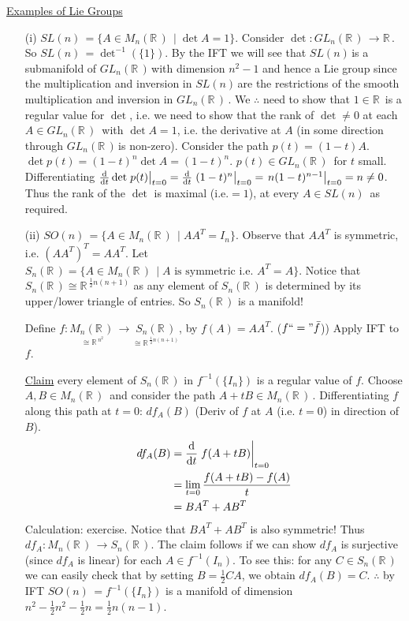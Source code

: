 \documentclass[12pt,a4paper]{article}
\newcommand{\rR}{\ensuremath{\mathbb{R}\,}}
\newcommand{\mnr}{\ensuremath{M_n(\rR)\,}}
\newcommand{\glnr}{\ensuremath{GL_n(\rR)\,}}
\newcommand{\gson}{\ensuremath{SO(n)\,}}
\newcommand{\gsln}{\ensuremath{SL(n)\,}}
\newcommand{\ul}[1]{\underline{#1}}
\begin{document}
\ul{Examples of Lie Groups}
\begin{itemize}
\item[(i)] $\gsln = \{A\in \mnr \mid \det A=1\}$. Consider $\det:\glnr\to \rR$. So $\gsln = \det^{-1}(\{1\})$.  By the IFT we will see that \gsln is a submanifold of \glnr with dimension $n^2-1$ and hence a Lie group since the multiplication and inversion in \gsln are the restrictions of the smooth multiplication and inversion in \glnr. We $\therefore$ need  to show that $1\in \rR$ is a regular value for $\det$, i.e. we need to show that the rank of $\det \neq 0$ at each $A\in \glnr$ with $\det A = 1$, i.e. the derivative at $A$ (in some direction through \glnr is non-zero). Consider the path $p(t)=(1-t)A$. $\det p(t) = (1-t)^n \det A = (1-t)^n$. $p(t)\in \glnr$ for $t$ small. Differentiating $\dv{t} \det \eval{p(t)}_{t=0}=\dv{t}\eval{(1-t)^n}_{t=0}=\eval{n(1-t)^{n-1}}_{t=0}=n\neq 0$.
Thus the rank of the $\det$ is maximal (i.e.$=1$), at every $A\in\gsln$ as required.
\item[(ii)] $\gson=\{A\in\mnr \mid AA^T=I_n\}$. Observe that $AA^T$ is symmetric, i.e. $(AA^T)^T=AA^T$. Let $S_n(\rR)=\{A\in \mnr \mid A \text{ is symmetric i.e. } A^T=A\}$. Notice that $S_n(\rR)\cong \rR^{\frac{1}{2}n(n+1)}$ as any element of $S_n(\rR)$ is determined by its upper/lower triangle of entries. So $S_n(\rR)$ is a manifold! 

Define $f:\underset{\cong \rR^{n^2}}{\mnr} \to \underset{\cong \rR^{\frac{1}{2}n(n+1)}}{S_n(\rR)}$, by $f(A)=AA^T$. ($f ``=" \bar{f}$)) Apply IFT to $f$. 

\ul{Claim} every element of $S_n(\rR)$ in $f^{-1}(\{I_n\})$ is a regular value of $f$. Choose $A,B \in \mnr$ and consider the path $A+tB\in \mnr$. Differentiating $f$ along this path at $t=0$: $df_A(B)$ (Deriv of $f$ at $A$ (i.e. $t=0$) in direction of $B$).
\begin{align*}
df_A(B)&=\dv{t}\eval{f(A+tB)}_{t=0}\\
&=\lim_{t=0} \frac{f(A+tB)-f(A)}{t}\\
&=BA^T+AB^T
\end{align*}
Calculation: exercise. Notice that $BA^T+AB^T$ is also symmetric! Thus $df_A:\mnr\to S_n(\rR)$. The claim follows if we can show $df_A$ is surjective (since $df_A$ is linear) for each $A\in f^{-1}(I_n)$. To see this: for any $C\in S_n(\rR) $ we can easily check that by setting $B=\frac{1}{2}CA$, we obtain $df_A(B)=C$. $\therefore$ by IFT $\gson =f^{-1}(\{I_n\})$ is a manifold of dimension $n^2-\frac{1}{2}n^2-\frac{1}{2}n=\frac{1}{2}n(n-1)$.

\end{itemize}
\end{document}
